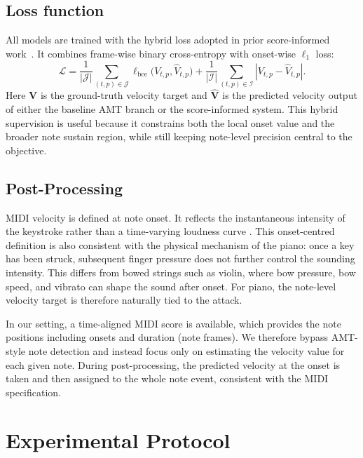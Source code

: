\subsection{Loss function}
\label{sec:scoreinf:loss}

All models are trained with the hybrid loss adopted in prior score-informed work~\cite{kim2024method}. It combines frame-wise binary cross-entropy with onset-wise $\ell_1$ loss:
\begin{equation}
\mathcal{L}
= \frac{1}{|\mathcal{J}|}\sum_{(t,p)\in\mathcal{J}} \ell_{\mathrm{bce}}\big(V_{t,p},\hat{V}_{t,p}\big)
+ \frac{1}{|\mathcal{I}|}\sum_{(t,p)\in\mathcal{I}} \left|V_{t,p}-\hat{V}_{t,p}\right|.
\label{eq:scoreinf:loss}
\end{equation}
Here $\mathbf{V}$ is the ground-truth velocity target and $\hat{\mathbf{V}}$ is the predicted velocity output of either the baseline AMT branch or the score-informed system. This hybrid supervision is useful because it constrains both the local onset value and the broader note sustain region, while still keeping note-level precision central to the objective.

\subsection{Post-Processing}
\label{sec:scoreinf:post}

MIDI velocity is defined at note onset. It reflects the instantaneous intensity of the keystroke rather than a time-varying loudness curve \cite{dan2006psy}. This onset-centred definition is also consistent with the physical mechanism of the piano: once a key has been struck, subsequent finger pressure does not further control the sounding intensity. This differs from bowed strings such as violin, where bow pressure, bow speed, and vibrato can shape the sound after onset. For piano, the note-level velocity target is therefore naturally tied to the attack.

In our setting, a time-aligned MIDI score is available, which provides the note positions including onsets and duration (note frames). We therefore bypass AMT-style note detection and instead focus only on estimating the velocity value for each given note. During post-processing, the predicted velocity at the onset is taken and then assigned to the whole note event, consistent with the MIDI specification.

\section{Experimental Protocol}
\label{sec:scoreinf:exp}

